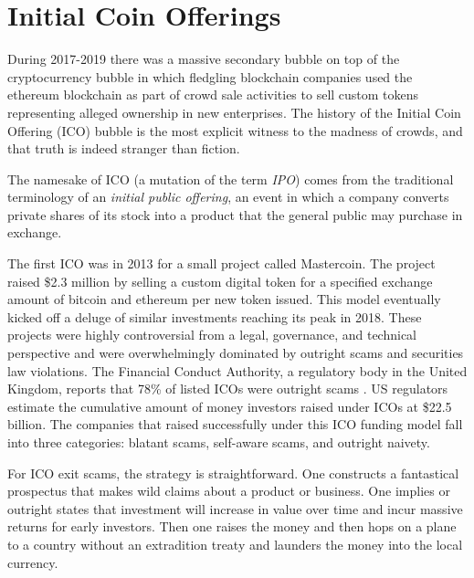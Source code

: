 \chapter{Initial Coin Offerings}

During 2017-2019 there was a massive secondary bubble on top of the
cryptocurrency bubble in which fledgling blockchain companies used the ethereum
blockchain as part of crowd sale activities to sell custom tokens representing
alleged ownership in new enterprises. The history of the Initial Coin Offering
(ICO) bubble is the most explicit witness to the madness of crowds, and that
truth is indeed stranger than fiction.

The namesake of ICO (a mutation of the term \textit{IPO}) comes from the
traditional terminology of an \textit{initial public offering}, an event in
which a company converts private shares of its stock into a product that the
general public may purchase in exchange.


The first ICO was in 2013 for a small project called Mastercoin. The project
raised \$2.3 million by selling a custom digital token for a specified exchange
amount of bitcoin and ethereum per new token issued. This model eventually
kicked off a deluge of similar investments reaching its peak in 2018. These
projects were highly controversial from a legal, governance, and technical
perspective and were overwhelmingly dominated by outright scams and securities
law violations. The Financial Conduct Authority, a regulatory body in the United
Kingdom, reports that 78\% of listed ICOs were outright scams
\cite{financial_conduct_authority_guidance_2019}. US regulators estimate the
cumulative amount of money investors raised under ICOs at \$22.5 billion. The
companies that raised successfully under this ICO funding model fall into three
categories: blatant scams, self-aware scams, and outright naivety.
\cite{de_jong_what_2018}


For ICO exit scams, the strategy is straightforward. One constructs a
fantastical prospectus that makes wild claims about a product or business. One
implies or outright states that investment will increase in value over time and
incur massive returns for early investors. Then one raises the money and then
hops on a plane to a country without an extradition treaty and launders the
money into the local currency.

